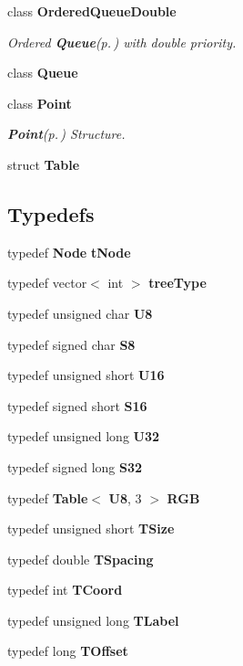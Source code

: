\begin{CompactItemize}
class {\bf Ordered\-Queue\-Double}
\begin{CompactList}\small\item\em Ordered {\bf Queue}{\rm (p.\,\pageref{classLibTIM_1_1Queue})} with double priority. \item\end{CompactList}\item 
class {\bf Queue}
\item 
class {\bf Point}
\begin{CompactList}\small\item\em {\bf Point}{\rm (p.\,\pageref{classLibTIM_1_1Point})} Structure. \item\end{CompactList}\item 
struct {\bf Table}
\end{CompactItemize}
\subsection*{Typedefs}
\begin{CompactItemize}
\item 
typedef {\bf Node} {\bf t\-Node}
\item 
typedef vector$<$ int $>$ {\bf tree\-Type}
\item 
typedef unsigned char {\bf U8}
\item 
typedef signed char {\bf S8}
\item 
typedef unsigned short {\bf U16}
\item 
typedef signed short {\bf S16}
\item 
typedef unsigned long {\bf U32}
\item 
typedef signed long {\bf S32}
\item 
typedef {\bf Table}$<$ {\bf U8}, 3 $>$ {\bf RGB}
\item 
typedef unsigned short {\bf TSize}
\item 
typedef double {\bf TSpacing}
\item 
typedef int {\bf TCoord}
\item 
typedef unsigned long {\bf TLabel}
\item 
typedef long {\bf TOffset}
\end{CompactItemize}
